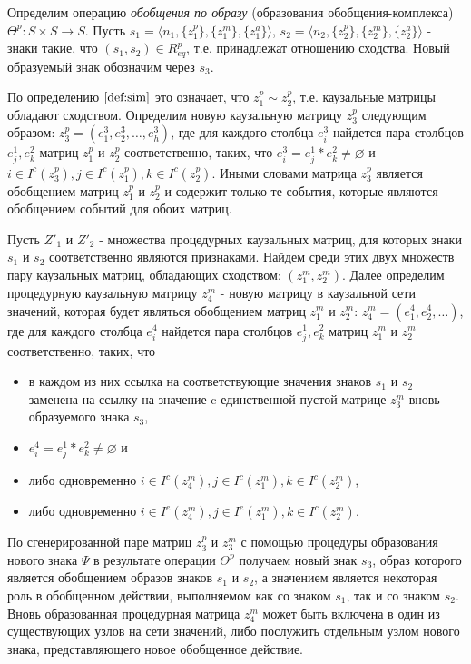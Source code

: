 \documentclass[12pt]{scrartcl}
\begin{document}
	Определим операцию \textit{обобщения по образу} (образования обобщения-комплекса) $\Theta^p: S\times S\rightarrow S$. Пусть $s_1=\langle n_1, \{z_1^p\}, \{z_1^m\}, \{z_1^a\} \rangle$, $s_2=\langle n_2, \{z_2^p\}, \{z_2^m\}, \{z_2^a\} \rangle$ - знаки такие, что $(s_1,s_2)\in R_{eq}^p$, т.е. принадлежат отношению сходства. Новый образуемый знак обозначим через $s_3$. 
	
	По определению $\autoref{def:sim}$ это означает, что $z_1^p\sim z_2^p$, т.е. каузальные матрицы обладают сходством. Определим новую каузальную матрицу $z_3^p$ следующим образом: $z_3^p=(e_1^3,e_2^3,\dots,e_h^3)$, где для каждого столбца $e_i^3$ найдется пара столбцов $e_j^1, e_k^2$ матриц $z_1^p$ и $z_2^p$ соответственно, таких, что $e_i^3=e_j^1*e_k^2\not=\varnothing$ и $i\in I^c(z_3^p), j\in I^c(z_1^p), k\in I^c(z_2^p)$. Иными словами матрица $z_3^p$ является обобщением матриц $z_1^p$ и $z_2^p$ и содержит только те события, которые являются обобщением событий для обоих матриц.
	
	Пусть $Z'_1$ и $Z'_2$ - множества процедурных каузальных матриц, для которых знаки $s_1$ и $s_2$ соответственно являются признаками. Найдем среди этих двух множеств пару каузальных матриц, обладающих сходством: $(z_1^m,z_2^m)$. Далее определим процедурную каузальную матрицу $z_4^m$ - новую матрицу в каузальной сети значений, которая будет являться обобщением матриц $z_1^m$ и $z_2^m$: $z_4^m=(e_1^4,e_2^4,\dots)$, где для каждого столбца $e_i^4$ найдется пара столбцов $e_j^1, e_k^2$ матриц $z_1^m$ и $z_2^m$ соответственно, таких, что
	\begin{itemize}
		\item в каждом из них ссылка на соответствующие значения знаков $s_1$ и $s_2$ заменена на ссылку на значение c единственной пустой матрице $z_3^m$ вновь образуемого знака $s_3$,
		\item $e_i^4=e_j^1*e_k^2\not=\varnothing$ и 
		\item либо одновременно $i\in I^c(z_4^m), j\in I^c(z_1^m), k\in I^c(z_2^m)$, 
		\item либо одновременно $i\in I^e(z_4^m), j\in I^e(z_1^m), k\in I^c(z_2^m)$.
	\end{itemize}
	
	По сгенерированной паре матриц $z_3^p$ и $z_3^m$ с помощью процедуры образования нового знака $\Psi$ в результате операции $\Theta^p$ получаем новый знак $s_3$, образ которого является обобщением образов знаков $s_1$ и $s_2$, а значением является некоторая роль в обобщенном действии, выполняемом как со знаком $s_1$, так и со знаком $s_2$. Вновь образованная процедурная матрица $z_4^m$ может быть включена в один из существующих узлов на сети значений, либо послужить отдельным узлом нового знака, представляющего новое обобщенное действие.
	
\end{document}
